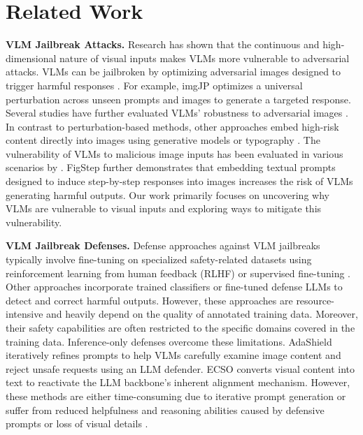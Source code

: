 \section{Related Work}

\textbf{VLM Jailbreak Attacks.}
Research has shown that the continuous and high-dimensional nature of visual inputs makes VLMs more vulnerable to adversarial attacks. VLMs can be jailbroken by optimizing adversarial images designed to trigger harmful responses \cite{niu2024jailbreaking, qi2024visual}. For example, imgJP \cite{niu2024jailbreaking} optimizes a universal perturbation across unseen prompts and images to generate a targeted response. Several studies have further evaluated VLMs’ robustness to adversarial images \cite{dong2023robust, han2023ot, zhao2024evaluating}. In contrast to perturbation-based methods, other approaches embed high-risk content directly into images using generative models \cite{liu2025mm, luo2024jailbreakv, li2025images} or typography \cite{gong2023figstep, liu2025mm, shayegani2023jailbreak}. The vulnerability of VLMs to malicious image inputs has been evaluated in various scenarios by \cite{liu2025mm, luo2024jailbreakv}. FigStep \cite{gong2023figstep} further demonstrates that embedding textual prompts designed to induce step-by-step responses into images increases the risk of VLMs generating harmful outputs. Our work primarily focuses on uncovering why VLMs are vulnerable to visual inputs and exploring ways to mitigate this vulnerability.


\textbf{VLM Jailbreak Defenses.} 
Defense approaches against VLM jailbreaks typically involve fine-tuning on specialized safety-related datasets using reinforcement learning from human feedback (RLHF) \cite{sun2023aligning, zhang2024spa} or supervised fine-tuning \cite{zong2024safety, chen2024dress}. Other approaches incorporate trained classifiers or fine-tuned defense LLMs \cite{pi2024mllm} to detect and correct harmful outputs. However, these approaches are resource-intensive and heavily depend on the quality of annotated training data. Moreover, their safety capabilities are often restricted to the specific domains covered in the training data. Inference-only defenses overcome these limitations. AdaShield \cite{wang2024adashield} iteratively refines prompts to help VLMs carefully examine image content and reject unsafe requests using an LLM defender. ECSO \cite{wang2024adashield} converts visual content into text to reactivate the LLM backbone's inherent alignment mechanism. However, these methods are either time-consuming due to iterative prompt generation or suffer from reduced helpfulness and reasoning abilities caused by defensive prompts or loss of visual details \cite{ding2024eta}.


